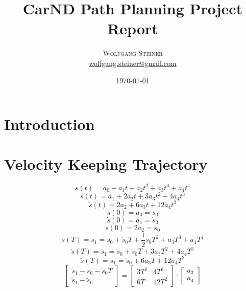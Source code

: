 \documentclass[twoside]{article}
\title{CarND Path Planning Project Report   } %
\author{%
\textsc{Wolfgang Steiner} \\[0.5ex] %
\normalsize \href{mailto:wolfgang.steiner@gmail.com}{wolfgang.steiner@gmail.com} %
}
\date{\today} %
\begin{document}
\maketitle

\section{Introduction}

\section{Velocity Keeping Trajectory}
\begin{equation}
s(t) = a_0 + a_1 t + a_2 t^2 + a_3 t^3 + a_4 t^4
\end{equation}
\begin{equation}
\dot{s}(t) = a_1 + 2 a_2 t + 3 a_3 t^2 + 4 a_4 t^3
\end{equation}
\begin{equation}
\ddot{s}(t) = 2 a_2 + 6 a_3 t + 12 a_4 t^2
\end{equation}
\begin{equation}
s(0) = a_0 = s_0
\end{equation}
\begin{equation}
\dot s(0) = a_1 = \dot s_0
\end{equation}
\begin{equation}
\ddot s(0) = 2 a_2 = \ddot s_0
\end{equation}
\begin{equation}
s(T) = s_1 = s_0 + \dot{s}_0 T + \frac{1}{2}\ddot{s}_0 T^2 + a_3 T^3 + a_4 T^4
\end{equation}
\begin{equation}
\dot s(T) = \dot s_1 = \dot s_0 + \ddot s_0 T + 3 a_3 T^2 + 4 a_4 T^3
\end{equation}
\begin{equation}
\ddot s(T) = \ddot s_1 = \ddot s_0 + 6 a_3 T + 12 a_4 T^2
\end{equation}
\begin{equation}
  \begin{bmatrix}
    \dot s_1 - \dot s_0 - \ddot s_0 T \\
    \ddot s_1 - \ddot s_0
  \end{bmatrix}
=
\begin{bmatrix}
3 T^2 & 4 T^3 \\
6 T & 12 T^2
\end{bmatrix}
\cdot
\begin{bmatrix}
  a_3 \\ a_4
\end{bmatrix}
\end{equation}
\end{document}
